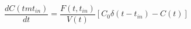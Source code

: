 \begin{equation}
\frac{dC(tmt_{in})}{dt} = \frac{F(t,t_{in})}{V(t)}[C_0\delta(t-t_{in})-C(t)]
\end{equation}